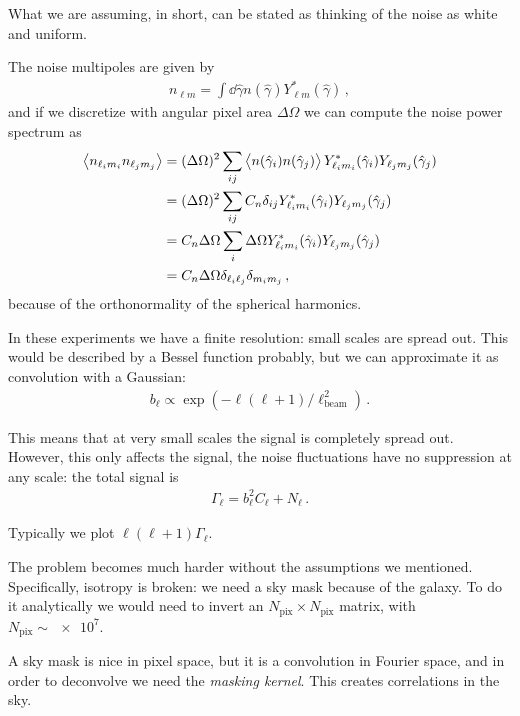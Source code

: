 \documentclass[main.tex]{subfiles}
\begin{document}
What we are assuming, in short, can be stated as thinking of the noise as white and uniform.

The noise multipoles are given by 
%
\begin{align}
n_{\ell m} = \int \dd{\hat{\gamma}} n(\hat{\gamma}) Y^{*}_{\ell m} (\hat{\gamma})
\,,
\end{align}
%
and if we discretize with angular pixel area \(\Delta \Omega \) we can compute the noise power spectrum as 
%
\begin{align}
\expval{n_{\ell_i m_i}n_{\ell_j m_j}}
&= (\Delta \Omega )^2 \sum _{ij} \expval{n(\hat{\gamma}_i) n(\hat{\gamma}_j)} Y^{*}_{\ell_i m_i} (\hat{\gamma}_i)Y_{\ell_j m_j} (\hat{\gamma}_j) \\
&= (\Delta \Omega )^2 \sum _{ij} C_n \delta_{ij} Y^{*}_{\ell_i m_i} (\hat{\gamma}_i)Y_{\ell_j m_j} (\hat{\gamma}_j)   \\
&= C_n \Delta \Omega \sum _i \Delta \Omega Y^{*}_{\ell_i m_i} (\hat{\gamma}_i)Y_{\ell_j m_j} (\hat{\gamma}_j)  \\
&= C_n \Delta \Omega \delta_{\ell_i \ell_j} \delta_{m_i m_j}
\,,
\end{align}
%
because of the orthonormality of the spherical harmonics. 

In these experiments we have a finite resolution: small scales are spread out. 
This would be described by a Bessel function probably, but we can approximate it as convolution with a Gaussian: 
%
\begin{align}
b_\ell \propto \exp(- \ell (\ell + 1) / \ell^2_{\text{beam}})
\,.
\end{align}

This means that at very small scales the signal is completely spread out. However, this only affects the signal, the noise fluctuations have no suppression at any scale: the total signal is 
%
\begin{align}
\Gamma _\ell = b_\ell^2 C_\ell + N_\ell
\,.
\end{align}

Typically we plot \(\ell (\ell+1) \Gamma_\ell\).

The problem becomes much harder without the assumptions we mentioned.
Specifically, isotropy is broken: we need a sky mask because of the galaxy. 
To do it analytically we would need to invert an \(N _{\text{pix}} \times N _{\text{pix}}\) matrix, with \(N _{\text{pix}}\sim \num{e7}\). 

A sky mask is nice in pixel space, but it is a convolution in Fourier space, and in order to deconvolve we need the \emph{masking kernel}. 
This creates correlations in the sky. 
\end{document}
